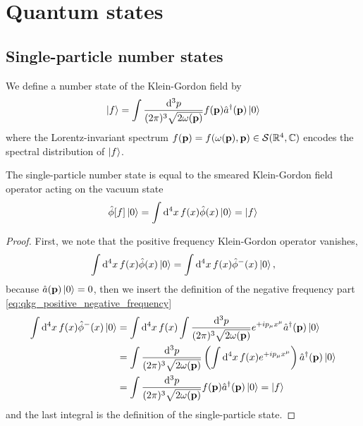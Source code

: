 \section{Quantum states}

\subsection{Single-particle number states}

\begin{definition}\label{def:single_particle_number_state}
	We define a number state of the Klein-Gordon field by
	\begin{equation}
		\ket{f}
		=
		\int\frac{\dd[3]{p}}{(2\pi)^3\sqrt{2\omega(\vb{p})}}
		f(\vb{p})
		\hat{a}^\dagger(\vb{p})
		\ket{0}
	\end{equation}
	where the Lorentz-invariant spectrum $f(\vb{p})=f(\omega(\vb{p}),\vb{p})\in\mathcal{S}(\mathbb{R}^4,\mathbb{C})$ encodes the spectral distribution of $\ket{f}$.
\end{definition}
\begin{lemma}
	The single-particle number state is equal to the smeared Klein-Gordon field operator acting on the vacuum state
	\begin{equation}
		\hat\phi[f]
		\ket{0}
		=
		\int\dd[4]{x}
		f(x)
		\hat\phi(x)
		\ket{0}
		=
		\ket{f}
	\end{equation}
\end{lemma}
\begin{proof}
	First, we note that the positive frequency Klein-Gordon operator vanishes,
	\begin{equation}
		\int\dd[4]{x}
		f(x)
		\hat\phi(x)
		\ket{0}
		=
		\int\dd[4]{x}
		f(x)
		\hat\phi^-(x)
		\ket{0}
		,
	\end{equation}
	because $\hat{a}(\vb{p})\ket{0}=0$, then we insert the definition of the negative frequency part \cref{eq:qkg_positive_negative_frequency}
	\begin{equation}
		\begin{split}
			\int\dd[4]{x}
			f(x)
			\hat\phi^-(x)
			\ket{0}
			&=
			\int\dd[4]{x}
			f(x)
			\int\frac{\dd[3]{p}}{(2\pi)^3\sqrt{2\omega(\vb{p})}}
			e^{+ip_\mu x^\mu}
			\hat{a}^\dagger(\vb{p})
			\ket{0}
			\\
			&=
			\int\frac{\dd[3]{p}}{(2\pi)^3\sqrt{2\omega(\vb{p})}}
			\left(
				\int\dd[4]{x}
				f(x)
				e^{+ip_\mu x^\mu}
			\right)
			\hat{a}^\dagger(\vb{p})
			\ket{0}
			\\
			&=
			\int\frac{\dd[3]{p}}{(2\pi)^3\sqrt{2\omega(\vb{p})}}
			f(\vb{p})
			\hat{a}^\dagger(\vb{p})
			\ket{0}
			=
			\ket{f}
		\end{split}
	\end{equation}
	and the last integral is the definition of the single-particle state.
\end{proof}
